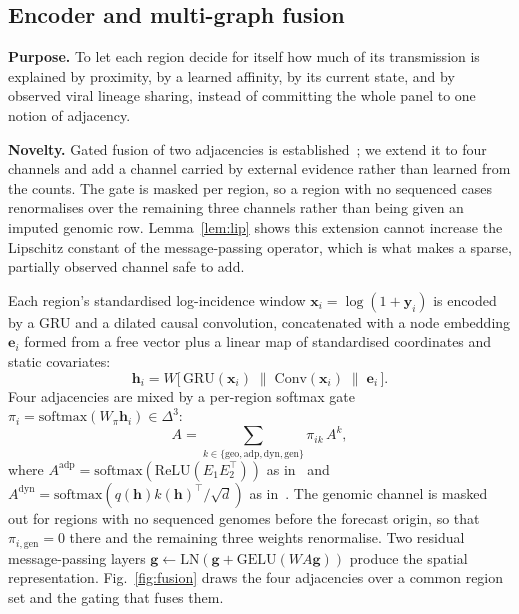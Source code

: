 \documentclass[conference]{IEEEtran}
\begin{document}
\subsection{Encoder and multi-graph fusion}

\textbf{Purpose.} To let each region decide for itself how much of its transmission is explained by proximity, by a learned affinity, by its current state, and by observed viral lineage sharing, instead of committing the whole panel to one notion of adjacency.

\textbf{Novelty.} Gated fusion of two adjacencies is established~\cite{colagnn}; we extend it to four channels and add a channel carried by external evidence rather than learned from the counts. The gate is masked per region, so a region with no sequenced cases renormalises over the remaining three channels rather than being given an imputed genomic row. Lemma~\ref{lem:lip} shows this extension cannot increase the Lipschitz constant of the message-passing operator, which is what makes a sparse, partially observed channel safe to add.


Each region's standardised log-incidence window $\mathbf{x}_i=\log(1+\mathbf{y}_i)$ is encoded by a GRU and a dilated causal convolution, concatenated with a node embedding $\mathbf{e}_i$ formed from a free vector plus a linear map of standardised coordinates and static covariates:
\begin{equation}
\mathbf{h}_i = W\big[\,\mathrm{GRU}(\mathbf{x}_i)\;\|\;\mathrm{Conv}(\mathbf{x}_i)\;\|\;\mathbf{e}_i\,\big].
\end{equation}
Four adjacencies are mixed by a per-region softmax gate $\pi_i=\mathrm{softmax}(W_\pi\mathbf{h}_i)\in\Delta^3$:
\begin{equation}
A = \sum_{k\in\{\mathrm{geo,adp,dyn,gen}\}} \pi_{ik}\,A^{k},
\label{eq:fuse}
\end{equation}
where $A^{\mathrm{adp}}=\mathrm{softmax}(\mathrm{ReLU}(E_1E_2^\top))$ as in~\cite{agcrn,mtgnn} and $A^{\mathrm{dyn}}=\mathrm{softmax}(q(\mathbf{h})k(\mathbf{h})^\top/\sqrt{d})$ as in~\cite{colagnn}. The genomic channel is masked out for regions with no sequenced genomes before the forecast origin, so that $\pi_{i,\mathrm{gen}}=0$ there and the remaining three weights renormalise. Two residual message-passing layers $\mathbf{g}\leftarrow\mathrm{LN}(\mathbf{g}+\mathrm{GELU}(W A\mathbf{g}))$ produce the spatial representation. Fig.~\ref{fig:fusion} draws the four adjacencies over a common region set and the gating that fuses them.
\end{document}
